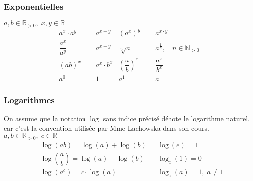 \documentclass{article}
\numberwithin{equation}{section}
\begin{document}
\subsubsection{Exponentielles}
\(a, b \in \mathbb{R}_{>0}, \; x, y \in \mathbb{R}\)
\begin{align*}
	a^x \cdot a^y 		&= a^{x+y} 			&	(a^x)^y 							&= a^{x \cdot y} \\
	\dfrac{a^x}{a^y} 	&= a^{x-y}  			&	\sqrt[n]{a}						&= a^{\frac{1}{n}}, \quad n \in \mathbb{N}_{>0} \\
	(ab)^x 				&= a^x \cdot b^x 	&	\left (\dfrac{a}{b} \right )^x 	&= \dfrac{a^x}{b^x} \\
	a^0 					&= 1 					& 	a^1 								&= a
\end{align*}

\subsubsection{Logarithmes}
On assume que la notation \(\log\) sans indice précisé dénote le logarithme naturel, car c'est la convention utilisée par Mme Lachowska dans son cours. \\
\(a, b \in \mathbb{R}_{>0}, \; c \in \mathbb{R}\)
\begin{align*}
	&\log(ab) 							= \log(a) + \log(b) 		&	&\log(e)		= 1 \\
	&\log{\left (\dfrac{a}{b}\right )} 	= \log (a) - \log (b) 	&	&\log_a(1)	= 0 \\
	&\log(a^c) 							= c \cdot \log(a) 		&	&\log_a(a)	= 1, \; a \neq 1 \\
\end{align*}
\end{document}
